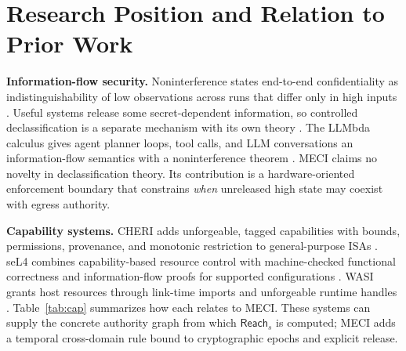 \documentclass[11pt,letterpaper]{article}
\theoremstyle{plain}
\theoremstyle{definition}
\newcommand{\Reach}{\mathsf{Reach}}
\begin{document}
\section{Research Position and Relation to Prior Work}\label{sec:related}

\textbf{Information-flow security.} Noninterference states end-to-end confidentiality as indistinguishability of low observations across runs that differ only in high inputs \cite{goguen1982,sabelfeld2003}. Useful systems release some secret-dependent information, so controlled declassification is a separate mechanism with its own theory \cite{myers2006,arden2021}. The LLMbda calculus gives agent planner loops, tool calls, and LLM conversations an information-flow semantics with a noninterference theorem \cite{llmbda}. MECI claims no novelty in declassification theory. Its contribution is a hardware-oriented enforcement boundary that constrains \emph{when} unreleased high state may coexist with egress authority.

\textbf{Capability systems.} CHERI adds unforgeable, tagged capabilities with bounds, permissions, provenance, and monotonic restriction to general-purpose ISAs \cite{cheri}. seL4 combines capability-based resource control with machine-checked functional correctness and information-flow proofs for supported configurations \cite{murray2013,sel4docs}. WASI grants host resources through link-time imports and unforgeable runtime handles \cite{wasi}. Table~\ref{tab:cap} summarizes how each relates to MECI. These systems can supply the concrete authority graph from which $\Reach_s$ is computed; MECI adds a temporal cross-domain rule bound to cryptographic epochs and explicit release.
\end{document}
